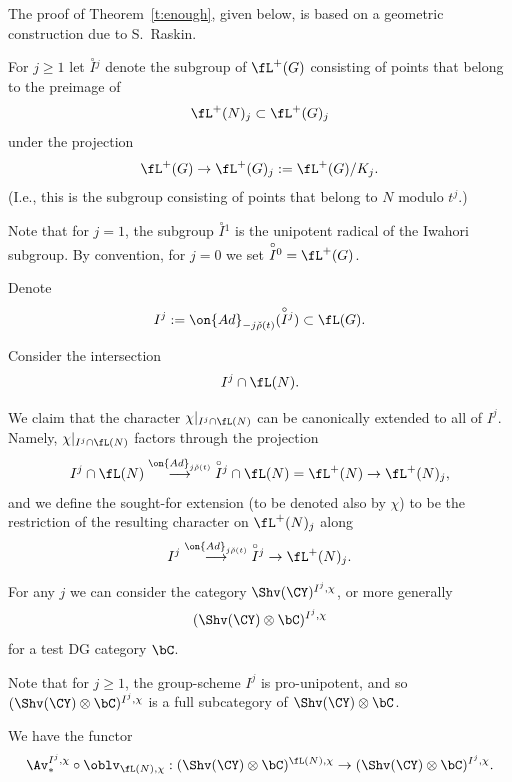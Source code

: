\documentclass[9pt]{amsart}
\theoremstyle{definition}
\theoremstyle{remark}
\newcommand{\thmref}[1]{Theorem~\ref{#1}}
\numberwithin{equation}{section}
\begin{document}
\ssec{Proof of \thmref{t:enough}}  \label{ss:Rask1}

The proof of \thmref{t:enough}, given below, is based on a geometric construction due to S.~Raskin. 

\sssec{}  \label{sss:adolesc}

For $j\geq 1$ let $\overset{\circ}I{}^j$ denote the subgroup of $\fL^+(G)$ consisting of points that belong to the preimage of 
$$\fL^+(N)_j\subset \fL^+(G)_j$$
under the projection
$$\fL^+(G)\to \fL^+(G)_j:=\fL^+(G)/K_j.$$
(I.e., this is the subgroup consisting of points that belong to $N$ modulo $t^j$.) 

\medskip

Note that for $j=1$, the subgroup $\overset{\circ}I{}^1$ is the unipotent radical of the Iwahori subgroup. By convention, for $j=0$
we set $\overset{\circ}I{}^0=\fL^+(G)$. 

\medskip

Denote 
$$I^j:=\on{Ad}_{-j\check\rho(t)}(\overset{\circ}I{}^j)\subset \fL(G).$$

\sssec{}

Consider the intersection
$$I^j\cap \fL(N).$$

We claim that the character $\chi|_{I^j\cap \fL(N)}$ can be canonically extended to all of $I^j$. Namely, $\chi|_{I^j\cap \fL(N)}$
factors through the projection
$$I^j\cap \fL(N) \overset{\on{Ad}_{j\check\rho(t)}}\longrightarrow \overset{\circ}I{}^j\cap \fL(N)=\fL^+(N)\to  \fL^+(N)_j,$$
and we define the sought-for extension (to be denoted also by $\chi$) 
to be the restriction of the resulting character on $\fL^+(N)_j$ along
$$I^j\overset{\on{Ad}_{j\check\rho(t)}}\longrightarrow \overset{\circ}I{}^j\to  \fL^+(N)_j.$$

\sssec{}

For any $j$ we can consider the category $\Shv(\CY)^{I^j,\chi}$, or more generally 
$$(\Shv(\CY)\otimes \bC)^{I^j,\chi}$$
for a test DG category $\bC$.

\medskip

Note that for $j\geq 1$, the group-scheme $I^j$ is pro-unipotent, and so $(\Shv(\CY)\otimes \bC)^{I^j,\chi}$
is a full subcategory of $\Shv(\CY)\otimes \bC$. 

\medskip

We have the functor
\begin{equation} \label{e:from infty to j}
\Av^{I^j,\chi}_*\circ \oblv_{\fL(N),\chi}:(\Shv(\CY)\otimes \bC)^{\fL(N),\chi}\to (\Shv(\CY)\otimes \bC)^{I^j,\chi}.
\end{equation} 
\end{document}
